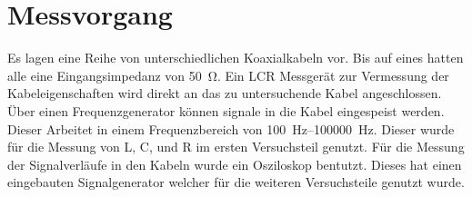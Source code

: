 \section{Messvorgang}

Es lagen eine Reihe von unterschiedlichen Koaxialkabeln vor. Bis auf eines hatten alle eine Eingangsimpedanz von \SI{50}{\ohm}.
Ein LCR Messgerät zur Vermessung der Kabeleigenschaften wird direkt an das zu untersuchende Kabel angeschlossen.
Über einen Frequenzgenerator können signale in die Kabel eingespeist werden.
Dieser Arbeitet in einem Frequenzbereich von \SIrange{100}{100000}{\hertz}. Dieser wurde für die Messung von L, C, und R im ersten Versuchsteil genutzt.
Für die Messung der Signalverläufe in den Kabeln wurde ein Osziloskop bentutzt.
Dieses hat einen eingebauten Signalgenerator welcher für die weiteren Versuchsteile genutzt wurde.
